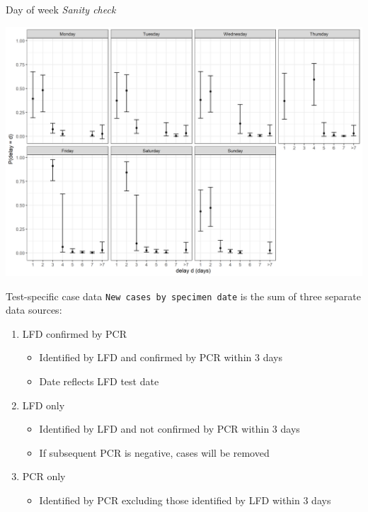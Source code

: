 \documentclass[
  ignorenonframetext,
]{beamer}
\providecommand{\tightlist}{%
  \setlength{\itemsep}{0pt}\setlength{\parskip}{0pt}}\usepackage{longtable,booktabs,array}
\begin{document}
\begin{frame}{Day of week}
\protect\hypertarget{day-of-week}{}
\emph{Sanity check}

\includegraphics{progress_presentation_files/figure-beamer/unnamed-chunk-4-1.png}
\end{frame}

\begin{frame}[fragile]{Test-specific case data}
\protect\hypertarget{test-specific-case-data}{}
\texttt{New\ cases\ by\ specimen\ date} is the sum of three separate
data sources:

\begin{enumerate}
\tightlist
\item
  LFD confirmed by PCR

  \begin{itemize}
  \tightlist
  \item
    Identified by LFD and confirmed by PCR within 3 days
  \item
    Date reflects LFD test date\\
  \end{itemize}
\item
  LFD only

  \begin{itemize}
  \tightlist
  \item
    Identified by LFD and not confirmed by PCR within 3 days
  \item
    If subsequent PCR is negative, cases will be removed
  \end{itemize}
\item
  PCR only

  \begin{itemize}
  \tightlist
  \item
    Identified by PCR excluding those identified by LFD within 3 days
  \end{itemize}
\end{enumerate}
\end{frame}
\end{document}
